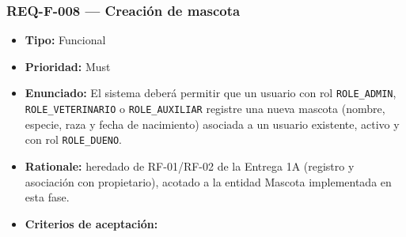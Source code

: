 \documentclass[
  spanish,
]{article}
\providecommand{\tightlist}{%
  \setlength{\itemsep}{0pt}\setlength{\parskip}{0pt}}
\begin{document}
\subsubsection{REQ-F-008 --- Creación de
mascota}\label{req-f-008-creaciuxf3n-de-mascota}

\begin{itemize}
\tightlist
\item
  \textbf{Tipo:} Funcional
\item
  \textbf{Prioridad:} Must
\item
  \textbf{Enunciado:} El sistema deberá permitir que un usuario con rol
  \texttt{ROLE\_\allowbreak{}ADMIN}, \texttt{ROLE\_\allowbreak{}VETERINARIO} o
  \texttt{ROLE\_\allowbreak{}AUXILIAR} registre una nueva mascota (nombre, especie,
  raza y fecha de nacimiento) asociada a un usuario existente, activo y
  con rol \texttt{ROLE\_\allowbreak{}DUENO}.
\item
  \textbf{Rationale:} heredado de RF-01/RF-02 de la Entrega 1A (registro
  y asociación con propietario), acotado a la entidad Mascota
  implementada en esta fase.
\item
  \textbf{Criterios de aceptación:}


\end{itemize}
\end{document}
